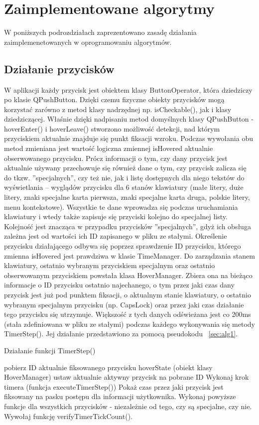 \documentclass[twoside,a4paper]{book}
\begin{document}
\chapter{Zaimplementowane algorytmy}
W poniższych podrozdziałach zaprezentowano zasadę działania zaimplemenetowanych w oprogramowaniu algorytmów. 
\section{Działanie przycisków}
W aplikacji każdy przycisk jest obiektem klasy ButtonOperator, która dziedziczy po klasie QPushButton. Dzięki czemu fizyczne obiekty przycisków mogą korzystać zarówno z metod klasy nadrzędnej np. isCheckable(), jak i klasy dziedziczącej. Właśnie dzięki nadpisaniu metod domyślnych klasy QPushButton  -  hoverEnter() i hoverLeave() stworzono możliwość detekcji, nad którym przyciskiem aktualnie znajduje się punkt fiksacji wzroku. Podczas wywołania obu metod zmieniana jest wartość logiczna zmiennej isHovered aktualnie obserwowanego przycisku.  Prócz informacji o tym, czy dany przycisk jest aktualnie używany przechowuje się również dane o tym, czy przycisk zalicza się do tkzw. ''specjalnych'', czy też nie, jak i listę dostępnych dla niego tekstów do wyświetlania – wyglądów przycisku dla 6 stanów klawiatury (małe litery, duże litery, znaki specjalne karta pierwsza, znaki specjalne karta druga, polskie litery, menu kontekstowe). Wszystkie te dane wprowadza się podczas  uruchamiania klawiatury i wtedy także zapisuje się przyciski kolejno do specjalnej listy. Kolejność jest znacząca w przypadku przycisków ''specjalnych'', gdyż ich obsługa zależna jest od wartości ich ID zapisanego w pliku ze stałymi. 
Określenie przycisku działającego odbywa się poprzez sprawdzenie ID przycisku, którego zmienna isHovered jest prawdziwa w klasie TimeManager. Do zarządzania stanem klawiatury, ostatnio wybranym przyciskiem specjalnym oraz ostatnio obserwowanym przyciskiem powstała klasa HoverManager. Zbiera ona na bieżąco informacje o  ID przycisku ostatnio najechanego, o tym przez jaki czas dany przycisk jest już pod punktem fiksacji, o aktualnym stanie klawiatury, o ostatnio wybranym specjalnym przycisku (np. CapsLock) oraz przez jaki czas działanie tego przycisku się utrzymuje. Większość z tych danych odświeżana jest co 200ms (stała zdefiniowana w pliku ze stałymi) podczas każdego wykonywania się metody TimerStep(). Jej działanie przedstawiono za pomocą pseudokodu ~\ref{sec:alg1}.
\begin{algorithm}
\caption{Działanie funkcji TimerStep()}
\label{sec:alg1}
\begin{algorithmic}
\STATE pobierz ID aktualnie fiksowanego przycisku
\STATE hoverState (obiekt klasy HoverManager) ustaw aktualnie aktywny przycisk na pobrane ID
\STATE Wykonaj krok timera (funkcja executeTimerStep())
\STATE Pokaż czas przez jaki przycisk jest fiksowany na pasku postępu dla informacji użytkownika.
\ENDIF
\ELSE
\STATE Wykonaj powyższe funkcje dla wszystkich przycisków - niezależnie od tego, czy są specjalne, czy nie.
\ENDIF
\ENDIF
\STATE Wywołaj funkcję verifyTimerTickCount().
\end{algorithmic}
\end{algorithm}
\end{document}
